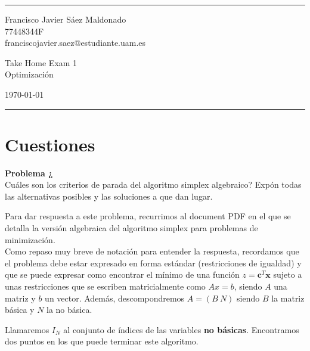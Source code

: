 \documentclass[a4paper]{article}
\newenvironment{problem}[2][Problema]
    { \begin{mdframed}[backgroundcolor=gray!20] \textbf{#1 #2} \\}
    {  \end{mdframed}}
\begin{document}

\fancyhead[C]{}
\hrule \medskip %
\begin{minipage}{0.295\textwidth}
\raggedright
\footnotesize
Francisco Javier Sáez Maldonado \hfill\\
77448344F \hfill\\
franciscojavier.saez@estudiante.uam.es
\end{minipage}
\begin{minipage}{0.4\textwidth}
\centering
\large
Take Home Exam 1\\
\normalsize
Optimización\\
\end{minipage}
\begin{minipage}{0.295\textwidth}
\raggedleft
\today\hfill\\
\end{minipage}
\medskip\hrule
\bigskip

\section{Cuestiones}

\begin{problem}{1}
¿Cuáles son los criterios de parada del algoritmo simplex algebraico? Expón todas las alternativas posibles y las soluciones a que dan lugar.
\end{problem}

Para dar respuesta a este problema, recurrimos al document PDF en el que se detalla la versión algebraica del algoritmo simplex para problemas de minimización.\\

Como repaso muy breve de notación para entender la respuesta, recordamos que el problema debe estar expresado en forma estándar (restricciones de igualdad) y que se puede expresar como encontrar el mínimo de una función \(z = \mathbf{c}^T \mathbf{x}\) sujeto a unas restricciones que se escriben matricialmente como \(Ax = b\), siendo \(A\) una matriz y \(b\) un vector. Además, descompondremos \(A = (B \ N)\) siendo \(B\) la matriz básica y \(N\) la no básica.

Llamaremos \(I_N\) al conjunto de índices de las variables \textbf{no básicas}. Encontramos dos puntos en los que puede terminar este algoritmo.
\end{document}
